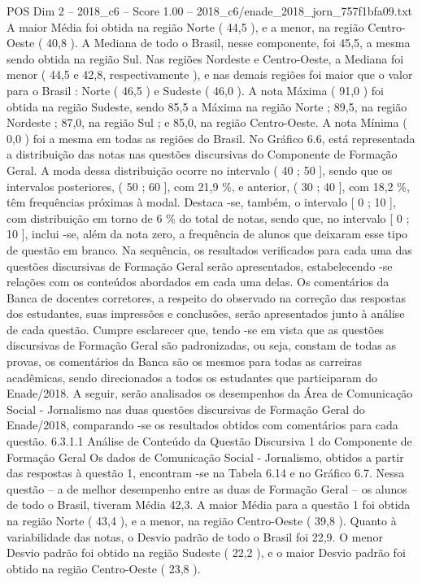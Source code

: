 \begin{textsample}{POS Dim 2 – 2018\_c6 – Score 1.00 – 2018\_c6/enade\_2018\_jorn\_757f1bfa09.txt}
A maior Média foi obtida na região Norte ( 44,5 ), e a menor, na região Centro-Oeste ( 40,8 ).
A Mediana de todo o Brasil, nesse componente, foi 45,5, a mesma sendo obtida na região Sul.
Nas regiões Nordeste e Centro-Oeste, a Mediana foi menor ( 44,5 e 42,8, respectivamente ), e nas demais regiões foi maior que o valor para o Brasil : Norte ( 46,5 ) e Sudeste ( 46,0 ).
A nota Máxima ( 91,0 ) foi obtida na região Sudeste, sendo 85,5 a Máxima na região Norte ; 89,5, na região Nordeste ; 87,0, na região Sul ; e 85,0, na região Centro-Oeste.
A nota Mínima ( 0,0 ) foi a mesma em todas as regiões do Brasil.
No Gráfico 6.6, está representada a distribuição das notas nas questões discursivas do Componente de Formação Geral.
A moda dessa distribuição ocorre no intervalo ( 40 ; 50 ], sendo que os intervalos posteriores, ( 50 ; 60 ], com 21,9 \%, e anterior, ( 30 ; 40 ], com 18,2 \%, têm frequências próximas à modal.
Destaca -se, também, o intervalo [ 0 ; 10 ], com distribuição em torno de 6 \% do total de notas, sendo que, no intervalo [ 0 ; 10 ], inclui -se, além da nota zero, a frequência de alunos que deixaram esse tipo de questão em branco.
Na sequência, os resultados verificados para cada uma das questões discursivas de Formação Geral serão apresentados, estabelecendo -se relações com os conteúdos abordados em cada uma delas.
Os comentários da Banca de docentes corretores, a respeito do observado na correção das respostas dos estudantes, suas impressões e conclusões, serão apresentados junto à análise de cada questão.
Cumpre esclarecer que, tendo -se em vista que as questões discursivas de Formação Geral são padronizadas, ou seja, constam de todas as provas, os comentários da Banca são os mesmos para todas as carreiras acadêmicas, sendo direcionados a todos os estudantes que participaram do Enade/2018.
A seguir, serão analisados os desempenhos da Área de Comunicação Social - Jornalismo nas duas questões discursivas de Formação Geral do Enade/2018, comparando -se os resultados obtidos com comentários para cada questão. 6.3.1.1 Análise de Conteúdo da Questão Discursiva 1 do Componente de Formação Geral Os dados de Comunicação Social - Jornalismo, obtidos a partir das respostas à questão 1, encontram -se na Tabela 6.14 e no Gráfico 6.7.
Nessa questão – a de melhor desempenho entre as duas de Formação Geral – os alunos de todo o Brasil, tiveram Média 42,3.
A maior Média para a questão 1 foi obtida na região Norte ( 43,4 ), e a menor, na região Centro-Oeste ( 39,8 ).
Quanto à variabilidade das notas, o Desvio padrão de todo o Brasil foi 22,9.
O menor Desvio padrão foi obtido na região Sudeste ( 22,2 ), e o maior Desvio padrão foi obtido na região Centro-Oeste ( 23,8 ).

\end{textsample}
